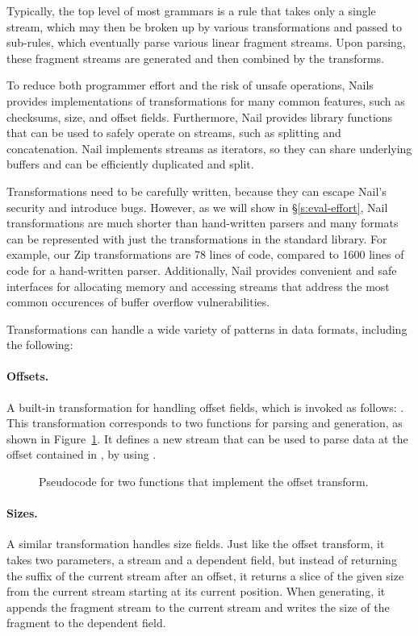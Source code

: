 Typically, the top level of most grammars is a rule that takes only a single stream, which may then
be broken up by various transformations and passed to sub-rules, which eventually parse various linear
fragment streams. Upon parsing, these fragment streams are generated and then combined by the
transforms.

 To reduce both programmer effort and the risk of unsafe operations, Nails provides implementations of
transformations for many common features, such as checksums, size, and offset fields. Furthermore,
Nail provides library functions that can be used to safely operate on streams, such as splitting and
concatenation. Nail implements streams as iterators, so they can share underlying buffers and can be
efficiently duplicated and split.

Transformations need to be carefully written, because they can escape Nail's security and introduce
bugs. However, as we will show in \S\ref{s:eval-effort}, Nail transformations are much shorter than
hand-written parsers and many formats can be represented with just the transformations in the
standard library. 
For example, our Zip transformations are 78 lines of code, compared to 1600 lines of code for a
   hand-written parser. Additionally, Nail provides convenient and safe interfaces for allocating
   memory and accessing streams that address the most common occurences of buffer overflow
   vulnerabilities.  

Transformations can handle a wide variety of patterns in data formats, including the following: 
\paragraph{Offsets.}
A built-in transformation for handling offset fields, which is invoked as follows:
. 
This transformation corresponds to two functions for parsing and
generation, as shown in Figure~\ref{fig:xform-sig}. It defines a new stream  that can
be used to parse data at the offset contained in , by
using .

\begin{figure}[h]
\smaller[0.5]

\caption{Pseudocode for two functions that implement the offset transform.}
\label{fig:xform-sig}
\end{figure}


\paragraph{Sizes.}
A similar transformation handles size fields. Just like the offset transform, it takes two parameters, a
stream and a dependent field, but instead of returning the suffix of the current stream after an
offset, it returns a slice of the given size from the current stream starting at its current
position. When generating, it appends the fragment stream to the current stream and writes the size
of the fragment to the dependent field.

